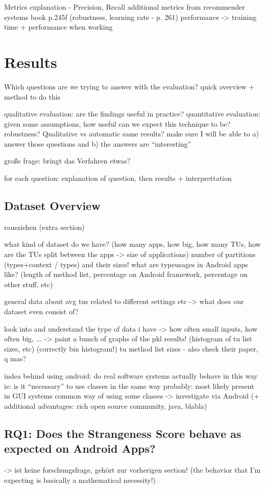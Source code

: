 Metrics explanation - Precision, Recall
    additional metrics from recommender systems book p.245f (robustness, learning rate - p. 261)
    performance -> training time + performance when working

\section{Results}
Which questions are we trying to answer with the evaluation?
quick overview + method to do this

qualitative evaluation: are the findings useful in practice?
quantitative evaluation: given some assumptions, how useful can we expect this technique to be? robustness? Qualitative vs automatic same results?
make sure I will be able to a) answer those questions and b) the answers are ``interesting''

große frage: bringt das Verfahren etwas?

for each question: explanation of question, then results + interprettation
\subsection{Dataset Overview}
rausziehen (extra section)

what kind of dataset do we have? (how many apps, how big, how many TUs, how are the TUs split between the apps -> size of applications)
number of partitions (types+context / types) and their sizes!
what are typeusages in Android apps like? (length of method list, percentage on Android framework, percentage on other stuff, etc) 

general data about avg tus related to different settings etc -> what does our dataset even consist of?

look into and understand the type of data i have -> how often small inputs, how often big, ...
-> paint a bunch of graphs of the pkl results! (histogram of tu list sizes,  etc) (correctly bin histogram!)
 tu method list sizes - also check their paper, q mas?

indea behind using android:
    do real software systems actually behave in this way
    ie: is it ``necessary'' to use classes in the same way
    probably: most likely present in GUI systems
    common way of using some classes -> investigate via Android (+ additional advantages: rich open source community, java, blabla)

\subsection{RQ1: Does the Strangeness Score behave as expected on Android Apps?}
-> ist keine forschungsfrage, gehört zur vorherigen section!
(the behavior that I'm expecting is basically a mathematical necessity!)

